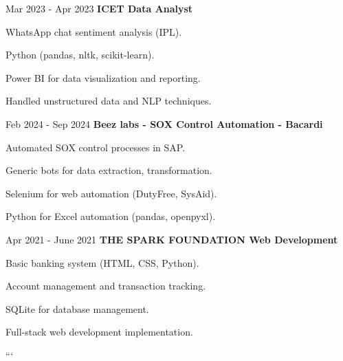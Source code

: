 \vspace{0.2 cm}
\begin{twocolentry}{
    Mar 2023 - Apr 2023
}
    \textbf{ICET Data Analyst}\end{twocolentry}
\vspace{0.10 cm}
\begin{onecolentry}
    \begin{highlights}
        \item WhatsApp chat sentiment analysis (IPL).
        \item Python (pandas, nltk, scikit-learn).
        \item Power BI for data visualization and reporting.
        \item Handled unstructured data and NLP techniques.
    \end{highlights}
\end{onecolentry}
\vspace{0.2 cm}
\begin{twocolentry}{
    Feb 2024 - Sep 2024
}
    \textbf{Beez labs - SOX Control Automation - Bacardi}\end{twocolentry}
\vspace{0.10 cm}
\begin{onecolentry}
    \begin{highlights}
        \item Automated SOX control processes in SAP.
        \item Generic bots for data extraction, transformation.
        \item Selenium for web automation (DutyFree, SysAid).
        \item Python for Excel automation (pandas, openpyxl).
    \end{highlights}
\end{onecolentry}
\vspace{0.2 cm}
\begin{twocolentry}{
    Apr 2021 - June 2021
}
    \textbf{THE SPARK FOUNDATION Web Development}\end{twocolentry}
\vspace{0.10 cm}
\begin{onecolentry}
    \begin{highlights}
        \item Basic banking system (HTML, CSS, Python).
        \item Account management and transaction tracking.
        \item SQLite for database management.
        \item Full-stack web development implementation.
    \end{highlights}
\end{onecolentry}

```

